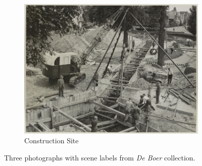 \documentclass[a4paper,twoside]{article}
\begin{document}
\begin{figure}
\begin{subfigure}[b]{0.33\textwidth}
    \includegraphics[width=\textwidth]{figures/construction_site.jpg}
    \caption{Construction Site}
    \label{fig:examplesc}
     \vspace{0.5em}
 \end{subfigure}
  \caption{Three photographs with scene labels from \textit{De Boer} collection.}
  \label{fig:examples_scenes}
\end{figure}
\end{document}
